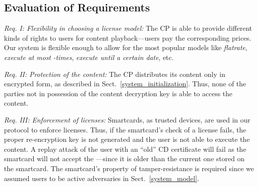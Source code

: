 \documentclass{llncs}
\newcommand{\refSec}[1]{Sect.~\ref{#1}}
\begin{document}
\subsection{Evaluation of Requirements}



\emph{Req. I: Flexibility in choosing a license model: } The CP is able to provide different kinds of rights to users for content playback---users pay the corresponding prices. Our system is flexible enough to allow for the most popular models like \emph{flatrate}, \emph{execute at most} \emph{-times}, \emph{execute until a certain date}, etc.

\emph{Req. II: Protection of the content: } The CP distributes its content only in encrypted form, as described in \refSec{system_initialization}. Thus, none of the parties not in possession of the content decryption key is able to access the content. 

\emph{Req. III: Enforcement of licenses: } Smartcards, as trusted devices, are used in our protocol to enforce licenses. Thus, if the smartcard's check of a license fails, the proper re-encryption key is not generated and the user is not able to execute the content. A replay attack of the user with an ``old'' CD certificate will fail as the smartcard will not accept the ---since it is older than the current one stored on the smartcard. The smartcard's property of tamper-resistance is required since we assumed users to be active adversaries in \refSec{system_model}. 
\end{document}
